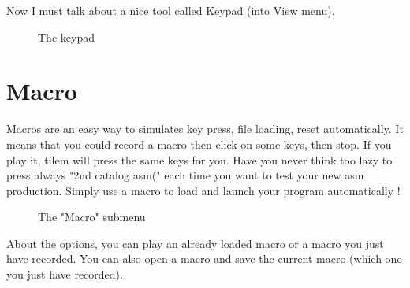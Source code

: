 \documentclass[10pt]{report}
\begin{document}
Now I must talk about a nice tool called Keypad (into View menu).\newline
\begin{figure}[H]
\centering
{}
\caption{The keypad}
\end{figure}

\section{Macro}

Macros are an easy way to simulates key press, file loading, reset automatically.\newline
It means that you could record a macro then click on some keys, then stop.\newline
If you play it, tilem will press the same keys for you.\newline
Have you never think too lazy to press always "2nd catalog asm(" each time you want to test your new asm production.\newline
Simply use a macro to load and launch your program automatically !\newline
\begin{figure}[H]
\centering
{}
\caption{The "Macro" submenu}
\end{figure}
About the options, you can play an already loaded macro or a macro you just have recorded.\newline
You can also open a macro and save the current macro (which one you just have recorded).\newline
\end{document}
